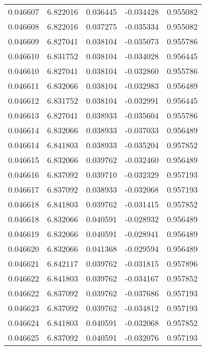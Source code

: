 \begin{tabular}{lrrrr}
0.046607    &  6.822016 &  0.036445 & -0.034428 &             0.955082 \\
0.046608    &  6.822016 &  0.037275 & -0.035334 &             0.955082 \\
0.046609    &  6.827041 &  0.038104 & -0.035073 &             0.955786 \\
0.046610    &  6.831752 &  0.038104 & -0.034028 &             0.956445 \\
0.046610    &  6.827041 &  0.038104 & -0.032860 &             0.955786 \\
0.046611    &  6.832066 &  0.038104 & -0.032983 &             0.956489 \\
0.046612    &  6.831752 &  0.038104 & -0.032991 &             0.956445 \\
0.046613    &  6.827041 &  0.038933 & -0.035604 &             0.955786 \\
0.046614    &  6.832066 &  0.038933 & -0.037033 &             0.956489 \\
0.046614    &  6.841803 &  0.038933 & -0.035204 &             0.957852 \\
0.046615    &  6.832066 &  0.039762 & -0.032460 &             0.956489 \\
0.046616    &  6.837092 &  0.039710 & -0.032329 &             0.957193 \\
0.046617    &  6.837092 &  0.038933 & -0.032068 &             0.957193 \\
0.046618    &  6.841803 &  0.039762 & -0.031415 &             0.957852 \\
0.046618    &  6.832066 &  0.040591 & -0.028932 &             0.956489 \\
0.046619    &  6.832066 &  0.040591 & -0.028941 &             0.956489 \\
0.046620    &  6.832066 &  0.041368 & -0.029594 &             0.956489 \\
0.046621    &  6.842117 &  0.039762 & -0.031815 &             0.957896 \\
0.046622    &  6.841803 &  0.039762 & -0.034167 &             0.957852 \\
0.046622    &  6.837092 &  0.039762 & -0.037686 &             0.957193 \\
0.046623    &  6.837092 &  0.039762 & -0.034812 &             0.957193 \\
0.046624    &  6.841803 &  0.040591 & -0.032068 &             0.957852 \\
0.046625    &  6.837092 &  0.040591 & -0.032076 &             0.957193 \\

\end{tabular}
